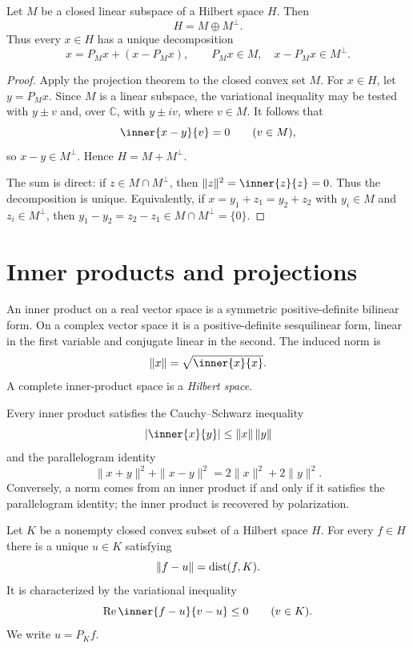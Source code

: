 \begin{notetheorem}
Let $M$ be a closed linear subspace of a Hilbert space $H$.  Then
\[
  H=M\oplus M^\perp.
\]
Thus every $x\in H$ has a unique decomposition
\[
  x=P_Mx+(x-P_Mx),
  \qquad
  P_Mx\in M,
  \quad x-P_Mx\in M^\perp.
\]
\end{notetheorem}

\begin{proof}
Apply the projection theorem to the closed convex set $M$.  For $x\in H$, let
$y=P_Mx$.  Since $M$ is a linear subspace, the variational inequality may be
tested with $y\pm v$ and, over $\mathbb C$, with $y\pm iv$, where $v\in M$.
It follows that
\[
  \inner{x-y}{v}=0\qquad(v\in M),
\]
so $x-y\in M^\perp$.  Hence $H=M+M^\perp$.

The sum is direct: if $z\in M\cap M^\perp$, then
$\|z\|^2=\inner{z}{z}=0$.  Thus the decomposition is unique.  Equivalently,
if $x=y_1+z_1=y_2+z_2$ with $y_i\in M$ and $z_i\in M^\perp$, then
$y_1-y_2=z_2-z_1\in M\cap M^\perp=\{0\}$.
\end{proof}

\section{Inner products and projections}

\begin{notedefinition}
An inner product on a real vector space is a symmetric positive-definite
bilinear form.  On a complex vector space it is a positive-definite
sesquilinear form, linear in the first variable and conjugate linear in the
second.
The induced norm is
\[
  \|x\|=\sqrt{\inner{x}{x}}.
\]
A complete inner-product space is a \emph{Hilbert space}.
\end{notedefinition}

\begin{noteproposition}
Every inner product satisfies the Cauchy--Schwarz inequality
\[
  |\inner{x}{y}|\le\|x\|\,\|y\|
\]
and the parallelogram identity
\[
  \|x+y\|^2+\|x-y\|^2
  =2\|x\|^2+2\|y\|^2.
\]
Conversely, a norm comes from an inner product if and only if it satisfies the
parallelogram identity; the inner product is recovered by polarization.
\end{noteproposition}

\begin{notetheorem}
Let $K$ be a nonempty closed convex subset of a Hilbert space $H$.  For every
$f\in H$ there is a unique $u\in K$ satisfying
\[
  \|f-u\|=\operatorname{dist}(f,K).
\]
It is characterized by the variational inequality
\[
  \operatorname{Re}\inner{f-u}{v-u}\le0
  \qquad(v\in K).
\]
We write $u=P_Kf$.
\end{notetheorem}

